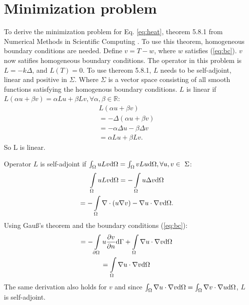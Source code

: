 \section{Minimization problem}
To derive the minimization problem for Eq. \ref{eq:heat}, theorem 5.8.1 from Numerical Methods in Scientific Computing \cite{kan}. To use this theorem, homogeneous boundary conditions are needed. Define $v=T-w$, where $w$ satisfies (\ref{eq:bc}). $v$ now satifies homogeneous boundary conditions. The operator in this problem is $L=-k\Delta$, and $L(T)=0$. To use thereom 5.8.1, $L$ needs to be self-adjoint, linear and positive in $\Sigma$. Where $\Sigma$ is a vector space consisting of all smooth functions satisfying the homogenous boundary conditions. $L$ is linear if $L(\alpha u+\beta v)=\alpha Lu+\beta Lv, \forall\alpha,\beta\in\mathbb{R}$:
\begin{gather*}
    L(\alpha u+\beta v)\\
    =-\Delta(\alpha u + \beta v)\\
    =-\alpha\Delta u-\beta \Delta v\\
    = \alpha Lu+\beta Lv.
\end{gather*}So L is linear.

Operator $L$ is self-adjoint if $\int\displaylimits_\Omega uLv \mathrm{d}\Omega=\int\displaylimits_\Omega vLu \mathrm{d}\Omega, \forall u,v\in~\Sigma$:
\begin{gather*}
    \int\displaylimits_\Omega uLv \mathrm{d}\Omega = -\int\displaylimits_\Omega u\Delta v \mathrm{d}\Omega\\
    =-\int\displaylimits_\Omega \nabla \cdot (u\nabla v) - \nabla u\cdot\nabla v \mathrm{d}\Omega.
\end{gather*}
Using Gau\ss's theorem and the boundary conditions (\ref{eq:bc}):
\begin{gather*}
    =-\int\displaylimits_{\partial\Omega} u\frac{\partial v}{\partial n} \mathrm{d}\Gamma + \int\displaylimits_\Omega \nabla u\cdot\nabla v \mathrm{d}\Omega\\
    =\int\displaylimits_\Omega \nabla u\cdot \nabla v\mathrm{d}\Omega
\end{gather*}
The same derivation also holds for $v$ and since $\int\displaylimits_\Omega \nabla u\cdot \nabla v \mathrm{d}\Omega = \int\displaylimits_\Omega \nabla v\cdot \nabla u \mathrm{d}\Omega$, $L$ is self-adjoint.

